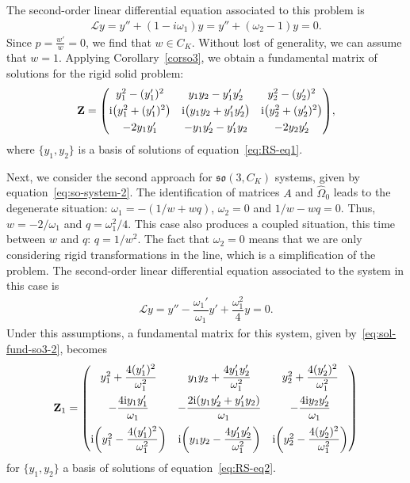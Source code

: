 \documentclass[pdftex]{sigma}%
\numberwithin{equation}{section}
\begin{document}
The second-order linear differential equation associated to this problem is
\begin{gather}\label{eq:RS-eq1}
 \mathcal{L} y = y'' + (1- i\omega_1)y = y'' + (\omega_2 -1)y = 0.
\end{gather}
Since $p= \frac{w'}{w} = 0$, we find that $w \in C_K$. Without lost of generality, we can assume that $w=1$. Applying Corollary~\ref{corso3}, we obtain a fundamental matrix of solutions for the rigid solid problem:
\begin{gather*}
\mathbf{Z} = \begin{pmatrix}
y_1^2 - (y_1')^2 & y_1 y_2 - y_1' y_2' & y_2^2 -(y_2')^{2} \\[3pt]
{\rm i} \big(y_1^2 + (y_1')^{2}\big) & {\rm i} \big(y_1 y_2 + y_1' y_2'\big) &
{\rm i} \big(y_2^2 + (y_2')^{2}\big) \\[3pt] -2y_1 y_1' & - y_1 y_2' - y_1' y_2 & -2 y_2 y_2' \end{pmatrix}\!,
\end{gather*}
where $\{ y_1, y_2 \}$ is a basis of solutions of equation~\eqref{eq:RS-eq1}.

Next, we consider the second approach for $\mathfrak{so}(3, C_K)$ systems, given by equation~\eqref{eq:so-system-2}. The identification of matrices $A$ and $\widehat{\Omega}_0$ leads to the degenerate situation: $\omega_1 = - (1/w + wq)$, $\omega_2 = 0$ and $1/w - wq =0$. Thus, $w = -2/ \omega_1$ and $q = \omega_1^2 /4$. This case also produces a coupled situation, this time between $w$ and $q$: $q = 1/w^2$. The fact that $\omega_2 = 0$ means that we are only considering rigid transformations in the line, which is a simplification of the problem. The second-order linear differential equation associated to the system in this case is
\begin{gather}\label{eq:RS-eq2}
 \mathcal{L} y = y'' - \dfrac{\omega_1'}{\omega_1} y' +\dfrac{\omega_1^2}{4}y =0.
\end{gather}
Under this assumptions, a fundamental matrix for this system, given by~\eqref{eq:sol-fund-so3-2}, becomes
\begin{gather*}
\mathbf{Z}_1 = \begin{pmatrix}
 y_1^2 + \dfrac{4 (y_1')^2}{\omega_1^2} & y_1 y_2 + \dfrac{4 y_1' y_2'}{\omega_1^2} & y_2^2 + \dfrac{4 (y_2')^2}{\omega_1^2} \\[10pt]
 - \dfrac{4{\rm i} y_1 y_1'}{\omega_1} & -\dfrac{2{\rm i} (y_1 y_2' + y_1' y_2)}{\omega_1} & - \dfrac{4{\rm i} y_2 y_2'}{\omega_1} \\[10pt]
 {\rm i}\bigg (y_1^2 - \dfrac{4 (y_1')^2}{\omega_1^2} \bigg ) & {\rm i} \bigg (y_1 y_2 - \dfrac{4 y_1' y_2'}{\omega_1^2} \bigg ) & {\rm i}\bigg (y_2^2 - \dfrac{4 (y_2')^2}{\omega_1^2} \bigg )
\end{pmatrix}
\end{gather*}
for $\{ y_1, y_2\}$ a basis of solutions of equation~\eqref{eq:RS-eq2}.
\end{document}
